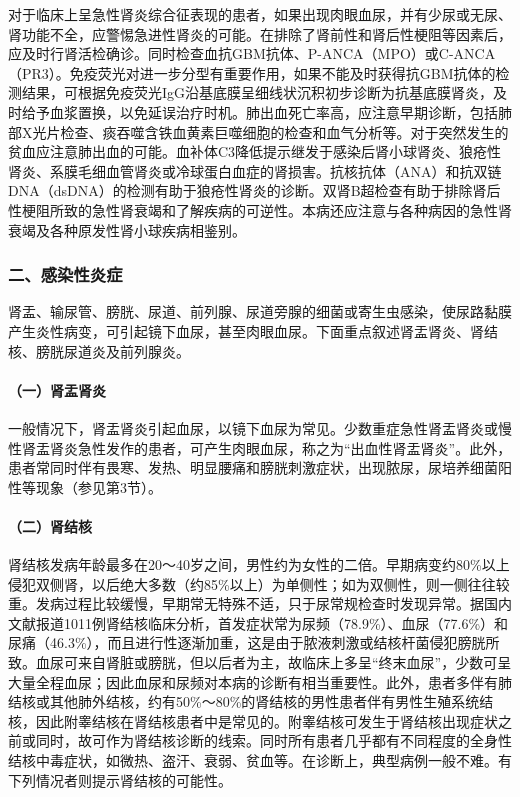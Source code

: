 对于临床上呈急性肾炎综合征表现的患者，如果出现肉眼血尿，并有少尿或无尿、肾功能不全，应警惕急进性肾炎的可能。在排除了肾前性和肾后性梗阻等因素后，应及时行肾活检确诊。同时检查血抗GBM抗体、P-ANCA（MPO）或C-ANCA（PR3）。免疫荧光对进一步分型有重要作用，如果不能及时获得抗GBM抗体的检测结果，可根据免疫荧光IgG沿基底膜呈细线状沉积初步诊断为抗基底膜肾炎，及时给予血浆置换，以免延误治疗时机。肺出血死亡率高，应注意早期诊断，包括肺部X光片检查、痰吞噬含铁血黄素巨噬细胞的检查和血气分析等。对于突然发生的贫血应注意肺出血的可能。血补体C3降低提示继发于感染后肾小球肾炎、狼疮性肾炎、系膜毛细血管肾炎或冷球蛋白血症的肾损害。抗核抗体（ANA）和抗双链DNA（dsDNA）的检测有助于狼疮性肾炎的诊断。双肾B超检查有助于排除肾后性梗阻所致的急性肾衰竭和了解疾病的可逆性。本病还应注意与各种病因的急性肾衰竭及各种原发性肾小球疾病相鉴别。

\subsubsection{二、感染性炎症}

肾盂、输尿管、膀胱、尿道、前列腺、尿道旁腺的细菌或寄生虫感染，使尿路黏膜产生炎性病变，可引起镜下血尿，甚至肉眼血尿。下面重点叙述肾盂肾炎、肾结核、膀胱尿道炎及前列腺炎。

\paragraph{（一）肾盂肾炎}

一般情况下，肾盂肾炎引起血尿，以镜下血尿为常见。少数重症急性肾盂肾炎或慢性肾盂肾炎急性发作的患者，可产生肉眼血尿，称之为“出血性肾盂肾炎”。此外，患者常同时伴有畏寒、发热、明显腰痛和膀胱刺激症状，出现脓尿，尿培养细菌阳性等现象（参见第3节）。

\paragraph{（二）肾结核}

肾结核发病年龄最多在20～40岁之间，男性约为女性的二倍。早期病变约80\%以上侵犯双侧肾，以后绝大多数（约85\%以上）为单侧性；如为双侧性，则一侧往往较重。发病过程比较缓慢，早期常无特殊不适，只于尿常规检查时发现异常。据国内文献报道1011例肾结核临床分析，首发症状常为尿频（78.9\%）、血尿（77.6\%）和尿痛（46.3\%），而且进行性逐渐加重，这是由于脓液刺激或结核杆菌侵犯膀胱所致。血尿可来自肾脏或膀胱，但以后者为主，故临床上多呈“终末血尿”，少数可呈大量全程血尿；因此血尿和尿频对本病的诊断有相当重要性。此外，患者多伴有肺结核或其他肺外结核，约有50\%～80\%的肾结核的男性患者伴有男性生殖系统结核，因此附睾结核在肾结核患者中是常见的。附睾结核可发生于肾结核出现症状之前或同时，故可作为肾结核诊断的线索。同时所有患者几乎都有不同程度的全身性结核中毒症状，如微热、盗汗、衰弱、贫血等。在诊断上，典型病例一般不难。有下列情况者则提示肾结核的可能性。

